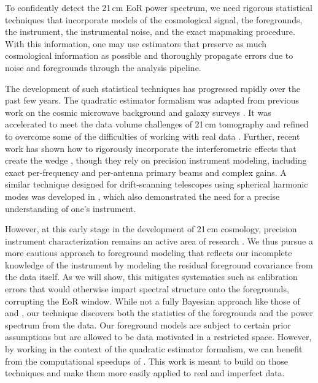 To confidently detect the 21\,cm EoR power spectrum, we need rigorous statistical techniques that incorporate models of the cosmological signal, the foregrounds, the instrument, the instrumental noise, and the exact mapmaking procedure. With this information, one may use estimators that preserve as much cosmological information as possible and thoroughly propagate errors due to noise and foregrounds through the analysis pipeline.

The development of such statistical techniques has progressed rapidly over the past few years. The quadratic estimator formalism was adapted \cite{LT11} from previous work on the cosmic microwave background \cite{Maxpowerspeclossless} and galaxy surveys \cite{Maxgalaxysurvey1}. It was accelerated to meet the data volume challenges of 21\,cm tomography \cite{DillonFast} and refined to overcome some of the difficulties of working with real data \cite{X13}.  Further, recent work has shown how to rigorously incorporate the interferometric effects that create the wedge \cite{AdrianWedge1,AdrianWedge2,dillonmapmaking}, though they rely on precision instrument modeling, including exact per-frequency and per-antenna primary beams and complex gains. A similar technique designed for drift-scanning telescopes using spherical harmonic modes was developed in \cite{Richard,shaw15}, which also demonstrated the need for a precise understanding of one's instrument.

However, at this early stage in the development of 21\,cm cosmology, precision instrument characterization remains an active area of research \cite{sutinjo2014,neben15,NewburghCHIMECal,pober12}. We thus pursue a more cautious approach to foreground modeling that reflects our incomplete knowledge of the instrument by modeling the residual foreground covariance from the data itself. As we will show, this mitigates systematics such as calibration errors that would otherwise impart spectral structure onto the foregrounds, corrupting the EoR window. While not a fully Bayesian approach like those of \cite{SutterBayesianImaging} and \cite{GibbsPSE}, our technique discovers both the statistics of the foregrounds and the power spectrum from the data. Our foreground models are subject to certain prior assumptions but are allowed to be data motivated in a restricted space. However, by working in the context of the quadratic estimator formalism, we can benefit from the computational speedups of \cite{DillonFast}. This work is meant to build on those techniques and make them more easily applied to real and imperfect data.

